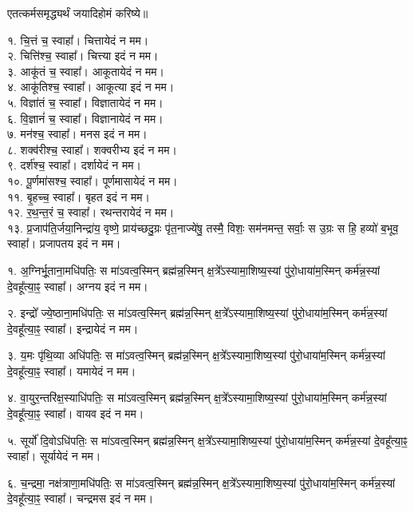 
एतत्कर्मसमृद्ध्यर्थं जयादिहोमं करिष्ये॥

१. चि॒त्तं च॒ स्वाहा᳚। चित्तायेदं न मम।\\
२. चित्ति॑श्च॒ स्वाहा᳚। चित्त्या इदं न मम।\\
३. आकू॑तं च॒ स्वाहा᳚। आकूतायेदं न मम।\\
४. आकू॑तिश्च॒ स्वाहा᳚। आकूत्या इदं न मम।\\
५. विज्ञा॑तं च॒ स्वाहा᳚। विज्ञातायेदं न मम।\\
६. वि॒ज्ञानं॑ च॒ स्वाहा᳚। विज्ञानायेदं न मम।\\
७. मन॑श्च॒ स्वाहा᳚। मनस इदं न मम।\\
८. शक्व॑रीश्च॒ स्वाहा᳚। शक्वरीभ्य इदं न मम।\\
९. दर्श॑श्च॒ स्वाहा᳚। दर्शायेदं न मम।\\
१०. पू॒र्णमा॑सश्च॒ स्वाहा᳚। पूर्णमासायेदं न मम।\\
११. बृ॒हच्च॒ स्वाहा᳚। बृहत इदं न मम।\\
१२. र॒थ॒न्त॒रं च॒ स्वाहा᳚। रथन्तरायेदं न मम।\\
१३. प्र॒जाप॑ति॒र्जया॒निन्द्रा॑य॒ वृष्णे॒ प्राय॑च्छदु॒ग्रः पृ॑त॒नाज्ये॑षु॒ तस्मै॒ विशः॒ सम॑नमन्त॒ सर्वाः॒ स उ॒ग्रः स हि॒ हव्यो॑ ब॒भूव॒ स्वाहा᳚। प्रजापतय इदं न मम।\\

\clearpage

१. अ॒ग्निर्भू॒ताना॒मधि॑पतिः॒ स मा॑ऽवत्व॒स्मिन् ब्रह्म॑न्न॒स्मिन् क्ष॒त्रे᳚ऽस्यामा॒शिष्य॒स्यां पु॑रो॒धाया॑म॒स्मिन् कर्म॑न्न॒स्यां दे॒वहू᳚त्या॒ꣴ॒ स्वाहा᳚। अग्नय इदं न मम।

२. इन्द्रो᳚ ज्ये॒ष्ठाना॒मधि॑पतिः॒ स मा॑ऽवत्व॒स्मिन् ब्रह्म॑न्न॒स्मिन् क्ष॒त्रे᳚ऽस्यामा॒शिष्य॒स्यां पु॑रो॒धाया॑म॒स्मिन् कर्म॑न्न॒स्यां दे॒वहू᳚त्या॒ꣴ॒ स्वाहा᳚। इन्द्रायेदं न मम।

३. य॒मः पृ॑थि॒व्या अधि॑पतिः॒ स मा॑ऽवत्व॒स्मिन् ब्रह्म॑न्न॒स्मिन् क्ष॒त्रे᳚ऽस्यामा॒शिष्य॒स्यां पु॑रो॒धाया॑म॒स्मिन् कर्म॑न्न॒स्यां दे॒वहू᳚त्या॒ꣴ॒ स्वाहा᳚। यमायेदं न मम।

४. वा॒युर॒न्तरि॑क्ष॒स्याधि॑पतिः॒ स मा॑ऽवत्व॒स्मिन् ब्रह्म॑न्न॒स्मिन् क्ष॒त्रे᳚ऽस्यामा॒शिष्य॒स्यां पु॑रो॒धाया॑म॒स्मिन् कर्म॑न्न॒स्यां दे॒वहू᳚त्या॒ꣴ॒ स्वाहा᳚। वायव इदं न मम।

५. सूर्यो॑ दि॒वोऽधि॑पतिः॒ स मा॑ऽवत्व॒स्मिन् ब्रह्म॑न्न॒स्मिन् क्ष॒त्रे᳚ऽस्यामा॒शिष्य॒स्यां पु॑रो॒धाया॑म॒स्मिन् कर्म॑न्न॒स्यां दे॒वहू᳚त्या॒ꣴ॒ स्वाहा᳚। सूर्यायेदं न मम।

६. च॒न्द्रमा॒ नक्ष॑त्राणा॒मधि॑पतिः॒ स मा॑ऽवत्व॒स्मिन् ब्रह्म॑न्न॒स्मिन् क्ष॒त्रे᳚ऽस्यामा॒शिष्य॒स्यां पु॑रो॒धाया॑म॒स्मिन् कर्म॑न्न॒स्यां दे॒वहू᳚त्या॒ꣴ॒ स्वाहा᳚। चन्द्रमस इदं न मम।

